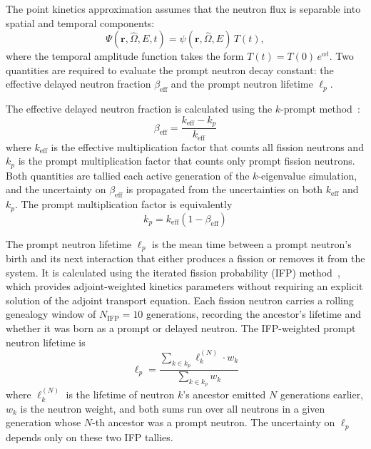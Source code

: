 \documentclass[12pt,preprint]{elsarticle}
\begin{document}
The point kinetics approximation assumes that the neutron flux is separable into spatial and temporal components:
\begin{equation}
\Psi(\mathbf{r}, \hat{\Omega}, E, t) = \psi(\mathbf{r}, \hat{\Omega}, E) \, T(t),
\end{equation}
where the temporal amplitude function takes the form $T(t) = T(0) \, e^{\alpha t}$. Two quantities are required to evaluate the prompt neutron decay constant: the effective delayed neutron fraction $\beta_{\mathrm{eff}}$ and the prompt neutron lifetime $\ell_p$.

The effective delayed neutron fraction is calculated using the $k$-prompt method~\cite{meulekamp2006}:
\begin{equation}
\beta_{\mathrm{eff}} = \frac{k_{\mathrm{eff}} - k_p}{k_{\mathrm{eff}}}
\label{eq:beff}
\end{equation}
where $k_{\mathrm{eff}}$ is the effective multiplication factor that counts all fission neutrons and $k_p$ is the prompt multiplication factor that counts only prompt fission neutrons. Both quantities are tallied each active generation of the $k$-eigenvalue simulation, and the uncertainty on $\beta_{\mathrm{eff}}$ is propagated from the uncertainties on both $k_{\mathrm{eff}}$ and $k_p$. The prompt multiplication factor is equivalently
\begin{equation}
k_p = k_{\mathrm{eff}} (1 - \beta_{\mathrm{eff}})
\label{eq:kp}
\end{equation}

The prompt neutron lifetime $\ell_p$ is the mean time between a prompt neutron's birth and its next interaction that either produces a fission or removes it from the system. It is calculated using the iterated fission probability (IFP) method~\cite{kiedrowski2011,nauchi2010}, which provides adjoint-weighted kinetics parameters without requiring an explicit solution of the adjoint transport equation. Each fission neutron carries a rolling genealogy window of $N_{\mathrm{IFP}} = 10$ generations, recording the ancestor's lifetime and whether it was born as a prompt or delayed neutron. The IFP-weighted prompt neutron lifetime is
\begin{equation}
\ell_p = \frac{\displaystyle\sum_{k \in k_p} \ell_k^{(N)} \cdot w_k}{\displaystyle\sum_{k \in k_p} w_k}
\label{eq:ellp_ifp}
\end{equation}
where $\ell_k^{(N)}$ is the lifetime of neutron $k$'s ancestor emitted $N$ generations earlier, $w_k$ is the neutron weight, and both sums run over all neutrons in a given generation whose $N$-th ancestor was a prompt neutron. The uncertainty on $\ell_p$ depends only on these two IFP tallies.
\end{document}
